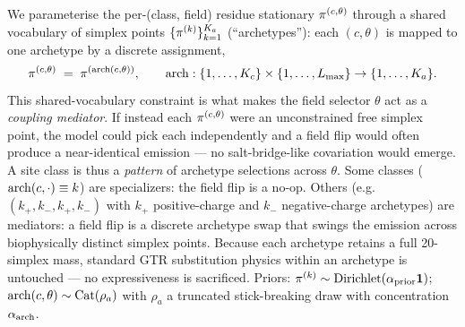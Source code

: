 We parameterise the per-(class, field) residue stationary
$\pi^{(c,\theta)}$ through a shared vocabulary of simplex points
$\{\pi^{(k)}\}_{k=1}^{K_a}$ (``archetypes''): each $(c, \theta)$ is
mapped to one archetype by a discrete assignment,
\begin{equation}
  \pi^{(c,\theta)} \;=\; \pi^{(\mathrm{arch}(c,\theta))},
  \qquad \mathrm{arch}: \{1,\dots,K_c\}\times\{1,\dots,L_{\max}\} \to \{1,\dots,K_a\}.
  \label{eq:arch-mapping}
\end{equation}
This shared-vocabulary constraint is what makes the field selector
$\theta$ act as a \emph{coupling mediator}. If instead each
$\pi^{(c,\theta)}$ were an unconstrained free simplex point, the model
could pick each independently and a field flip would often produce a
near-identical emission --- no salt-bridge-like covariation would
emerge. A site class is thus a \emph{pattern} of archetype selections
across $\theta$. Some classes ($\mathrm{arch}(c,\cdot) \equiv k$) are
specializers: the field flip is a no-op. Others (e.g.\
$(k_+, k_-, k_+, k_-)$ with $k_+$ positive-charge and $k_-$
negative-charge archetypes) are mediators: a field flip is a discrete
archetype swap that swings the emission across biophysically distinct
simplex points. Because each archetype retains a full 20-simplex mass,
standard GTR substitution physics within an archetype is untouched ---
no expressiveness is sacrificed. Priors: $\pi^{(k)} \sim
\mathrm{Dirichlet}(\alpha_{\text{prior}}\mathbf 1)$; $\mathrm{arch}(c,\theta)
\sim \mathrm{Cat}(\rho_a)$ with $\rho_a$ a truncated stick-breaking
draw with concentration $\alpha_{\mathrm{arch}}$.

